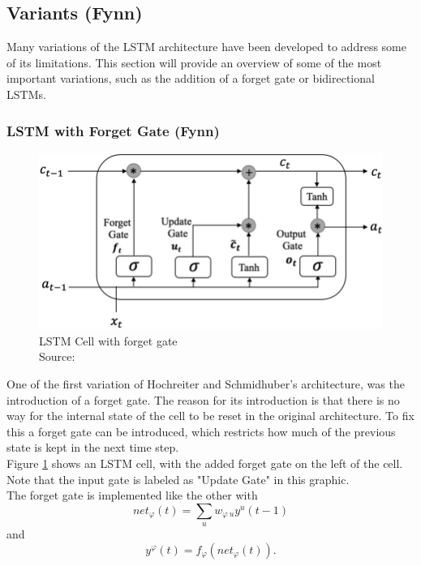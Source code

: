 \documentclass[twoside,a4paper,10pt,DIV=12,BCOR=12mm]{scrartcl}
\begin{document}
\subsection{Variants (Fynn)}

Many variations of the LSTM architecture have been developed to address some of its limitations. This section will provide an overview of some of the most important variations, such as the addition of a forget gate or bidirectional LSTMs.

\subsubsection{LSTM with Forget Gate (Fynn)}
\begin{figure}[h!]
    \centering
    \includegraphics[width=0.75\linewidth]{Structure-of-LSTM-cell-which-introduces-three-special-gates-Input-Gate-i-Forget-Gate.png}
    \caption{LSTM Cell with forget gate\\ Source: \cite{nguyen2022lstmforgetgraphic}}
    \label{fig:lstm-forget}
\end{figure}
One of the first variation of Hochreiter and Schmidhuber's architecture, was the introduction of a forget gate. The reason for its introduction is that there is no way for the internal state of the cell to be reset in the original architecture. To fix this a forget gate can be introduced, which restricts how much of the previous state is kept in the next time step.\cite{gers1999forgetgate}\\
Figure \ref{fig:lstm-forget} shows an LSTM cell, with the added forget gate on the left of the cell. Note that the input gate is labeled as "Update Gate" in this graphic.\\
The forget gate is implemented like the other with\cite{gers1999forgetgate}
\begin{equation}
    net_\varphi(t)=\sum_uw_{\varphi\ u}y^u(t-1)
    \label{eqn:forget-net-in}
\end{equation}
and
\begin{equation}
    y^\varphi(t)=f_\varphi\left(net_\varphi(t)\right).
    \label{eqn:forget-actiavtions}
\end{equation} 
\end{document}
